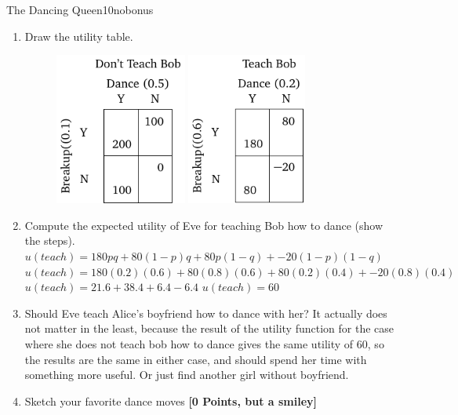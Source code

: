 \documentclass[twoside,english,colorbacktitle,accentcolor=tud9c,10pt]{tudexercise}
\begin{document}
\begin{questions}
\begin{question}{The Dancing Queen}{10}{nobonus}
	\begin{enumerate}
		\item Draw the utility table.
		\begin{figure}[H]
		\includegraphics[height=5cm]{answernoteach.pdf}
		\centering
		\includegraphics[height=5cm]{answerteach.pdf}
		\end{figure}
		\item Compute the expected utility of Eve for teaching Bob how to dance (show the steps).
		\newline
		\newline
		$u(teach)=180pq + 80(1-p)q + 80p(1-q) + -20(1-p)(1-q)$
		\newline
		$u(teach)=180(0.2)(0.6) + 80(0.8)(0.6) + 80(0.2)(0.4) + -20(0.8)(0.4)$
		\newline
		$u(teach)=21.6 + 38.4 + 6.4-6.4$
		\newline
		$u(teach)=60$
		\item Should Eve teach Alice's boyfriend how to dance with her?
		\newline
		\newline
		It actually does not matter in the least, because the result of the utility function for the case where she does not teach bob how to dance gives the same utility of 60, so the results are the same in either case, and should spend her time with something more useful. Or just find another girl without boyfriend.
		\item Sketch your favorite dance moves \textbf{[0 Points, but a smiley]}
		\begin{figure}[H]

\end{figure}
\end{enumerate}
\end{question}
\end{questions}
\end{document}
